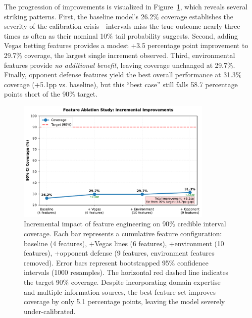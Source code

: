 \begin{table}[t]
  \centering
  \caption{Phase 1: Feature Ablation Study for BNN Calibration}
  \label{tab:phase1_feature_ablation}
  
\end{table}

The progression of improvements is visualized in Figure~\ref{fig:feature_ablation_progression}, which reveals several striking patterns. First, the baseline model's 26.2\% coverage establishes the severity of the calibration crisis—intervals miss the true outcome nearly three times as often as their nominal 10\% tail probability suggests. Second, adding Vegas betting features provides a modest +3.5 percentage point improvement to 29.7\% coverage, the largest single increment observed. Third, environmental features provide \textit{no additional benefit}, leaving coverage unchanged at 29.7\%. Finally, opponent defense features yield the best overall performance at 31.3\% coverage (+5.1pp vs. baseline), but this ``best case'' still falls 58.7 percentage points short of the 90\% target.

\begin{figure}[t]
    \centering
    \includegraphics[width=0.85\textwidth]{../figures/out/feature_ablation_progression.pdf}
    \caption{Incremental impact of feature engineering on 90\% credible interval coverage. Each bar represents a cumulative feature configuration: baseline (4 features), +Vegas lines (6 features), +environment (10 features), +opponent defense (9 features, environment features removed). Error bars represent bootstrapped 95\% confidence intervals (1000 resamples). The horizontal red dashed line indicates the target 90\% coverage. Despite incorporating domain expertise and multiple information sources, the best feature set improves coverage by only 5.1 percentage points, leaving the model severely under-calibrated.}
    \label{fig:feature_ablation_progression}
\end{figure}

